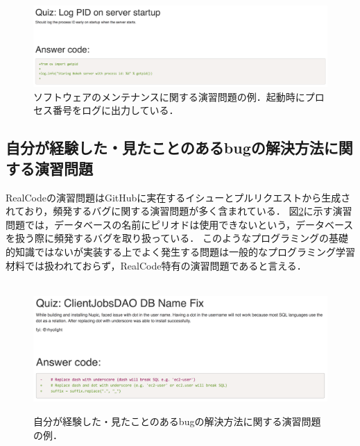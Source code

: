 \begin{figure}[H]
\vspace{-0.05cm}
	\centering
  \includegraphics[width=0.95\columnwidth]{20190107-lab-study-maintenance-exercise.png}
  \vspace{-0.05cm}
  \caption{ソフトウェアのメンテナンスに関する演習問題の例．起動時にプロセス番号をログに出力している．}
  \label{fig:lab-study-eg-maintenance}
  \vspace{-0.35cm}
\end{figure}

\subsection{自分が経験した・見たことのあるbugの解決方法に関する演習問題}

RealCodeの演習問題はGitHubに実在するイシューとプルリクエストから生成されており，頻発するバグに関する演習問題が多く含まれている．
図\ref{fig:lab-study-eg-experience}に示す演習問題では，データベースの名前にピリオドは使用できないという，データベースを扱う際に頻発するバグを取り扱っている．
このようなプログラミングの基礎的知識ではないが実装する上でよく発生する問題は一般的なプログラミング学習材料では扱われておらず，RealCode特有の演習問題であると言える．

\begin{figure}[H]
　\centering
　\vspace{-0.3cm}
　\includegraphics[width=0.95\columnwidth]{20190107-lab-study-experience-exercise.png}
  \caption{自分が経験した・見たことのあるbugの解決方法に関する演習問題の例．}
  \label{fig:lab-study-eg-experience}
  \vspace{-0.2cm}
\end{figure}


